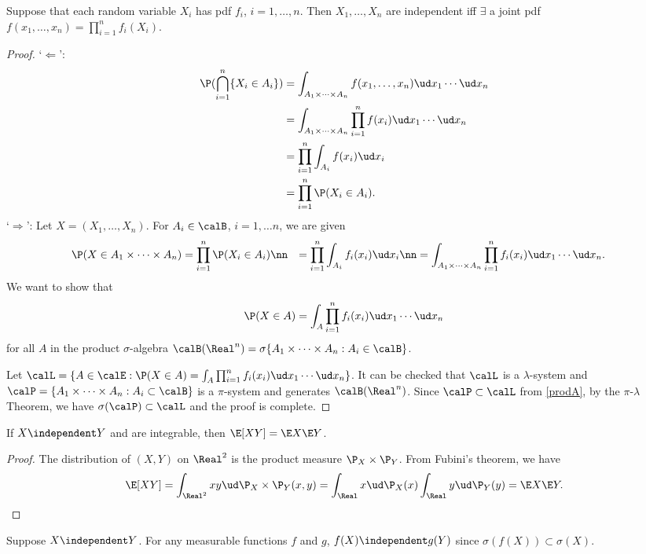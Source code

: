 \documentclass[../aipt.tex]{subfiles}
\begin{document}
\begin{Lemma} 
Suppose that each random variable $X_i$ has pdf $f_i$, $i=1,\ldots,n$. Then $X_1,\ldots , X_n$ are independent iff $\exists$ a joint pdf $f(x_1,\ldots,x_n)=\prod_{i=1}^n {f_i (X_i)}$.
\end{Lemma}
\begin{proof}
`$\Leftarrow$':
\begin{align*}
\P (\bigcap_{i=1}^n \{X_i \in A_i\}) & = \int_{A_1 \times \cdots \times A_n} f(x_1, \ldots, x_n) \ud x_1 \cdots \ud x_n\\
& = \int_{A_1 \times \cdots \times A_n} \prod_{i=1}^n {f(x_i)} \ud x_1 \cdots \ud x_n\\
& =  \prod_{i=1}^n \int_{A_i} {f(x_i)} \ud x_i\\
& =  \prod_{i=1}^n {\P (X_i \in A_i)}. 
\end{align*}
`$\Rightarrow$':
Let $X=(X_1,\ldots,X_n)$. For $A_i \in \calB$, $i=1, \ldots n$, we are given
\begin{align}
\P(X \in A_1\times \cdots \times A_n) & =\prod_{i=1}^n {\P (X_i \in A_i)}\nn
& =  \prod_{i=1}^n \int_{A_i} {f_i(x_i)} \ud x_i\nn
& = \int_{A_1 \times \cdots \times A_n} \prod_{i=1}^n f_i(x_i) \ud x_1\cdots\ud x_n.\label{prodA}
\end{align}
We want to show that 
\begin{align*}
\P(X\in A) = \int_A \prod_{i=1}^n f_i(x_i) \ud x_1\cdots\ud x_n
\end{align*}
for all $A$ in the product $\sigma$-algebra $\calB(\Real^n)=\sigma \{A_1 \times \cdots \times A_n: A_i \in \calB\}$. 

Let $\calL=\{A \in \calE : \P(X\in A)= \int_{A} \prod_{i=1}^n {f_i(x_i)} \ud x_1 \cdots \ud x_n\}$. It can be checked that $\calL$ is a $\lambda$-system and $\calP = \{ {A_1 \times \cdots \times A_n}: A_i \subset \calB\}$ is a $\pi$-system and generates $\calB(\Real^n)$. Since $\calP \subset \calL$ from \cref{prodA}, by the $\pi$-$\lambda$ Theorem, we have $\sigma(\calP) \subset \calL$ and the proof is complete.
\end{proof}

\begin{Lemma}
If $X \independent Y$ and are integrable, then $\E[XY]=\E X \E Y$.
\end{Lemma}
\begin{proof}
The distribution of $(X,Y)$ on $\Real^2$ is the product measure $\P_X \times \P_Y$. From Fubini's theorem, we have
\begin{align*}
\E[XY] = \int_{\Real^2} xy \ud \P_X\times\P_Y(x,y) = \int_\Real x \ud\P_X(x) \int_\Real y \ud \P_Y(y) = \E X \E Y.
\end{align*}
\end{proof}

Suppose $X \independent Y$. For any measurable functions $f$ and $g$, $f(X)\independent g(Y)$ since $\sigma(f(X)) \subset \sigma(X)$.



%

\end{document}
